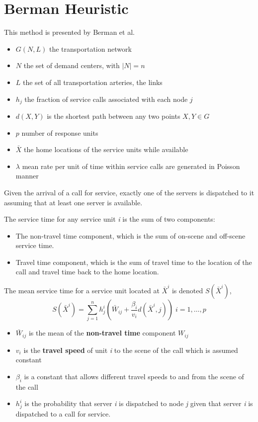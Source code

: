 \chapter{Berman Heuristic}
This method is presented by Berman et al. \cite{berman1987stochastic}

\begin{itemize}
\item $G(N,L)$ the transportation network
\item $N$ the set of demand centers,
  with $|N| = n$
\item $L$ the set of all transportation arteries,
  the links
\item $h_j$ the fraction of service calls
  associated with each node $j$
\item $d(X,Y)$ is the shortest path between any two points $X,Y \in G$
\item $p$ number of response units
\item $\bar{X}$ the home locations of the service units while available
\item $\lambda$ mean rate per unit of time
  within service calls are generated in Poisson manner
\end{itemize}

Given the arrival of a call for service,
exactly one of the servers is dispatched to it
assuming that at least one server is available.

The service time for any service unit \textit{i}
is the sum of two components:
\begin{itemize}
\item The non-travel time component,
  which is the sum of
  on-scene and off-scene service time.
\item Travel time component,
  which is the sum of travel time
  to the location of the call
  and travel time back to the home location.
\end{itemize}

The mean service time 
for a service unit located at $\bar{X}^i$ 
is denoted $S(\bar{X}^i)$,
\begin{equation}
  S(\bar{X}^i) =
  \sum_{j = 1}^{n} {
    h_j^i\left(
    \bar{W}_{ij}
    +\frac{{\beta}_i}{v_i}d(\bar{X}^i,j)
    \right)
  } \; i=1,\ldots,p
\end{equation}
\begin{itemize}
\item $\bar{W}_{ij}$ is the mean
  of the \textbf{non-travel time} component $W_{ij}$
\item $v_i$ is the \textbf{travel speed} of unit \textit{i}
  to the scene of the call
  which is assumed constant
\item $\beta_i$ is a constant
  that allows different travel speeds
  to and from the scene of the call
\item $h_j^i$ is the probability that server \textit{i} 
  is dispatched to node \textit{j}
  given that server \textit{i}
  is dispatched to a call for service.
\end{itemize}

